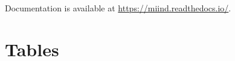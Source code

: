 \documentclass[utf8]{frontiersSCNS} %
\begin{document}
Documentation is available at \url{https://miind.readthedocs.io/}.



\newpage


\section*{Tables}
\end{document}
